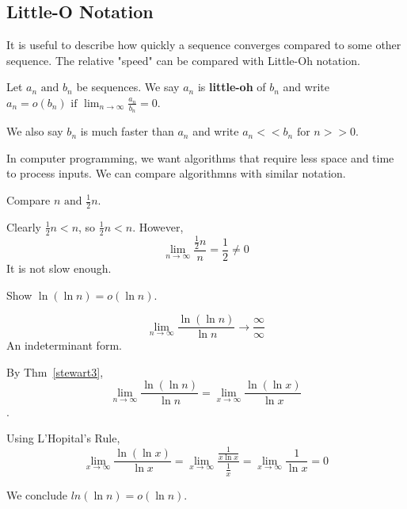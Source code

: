 \documentclass[../main.tex]{subfiles}
\begin{document}
\subsection{Little-O Notation}

It is useful to describe how quickly a sequence converges compared to some other sequence. The relative "speed" can be compared with Little-Oh notation.

\begin{definition}
    Let \( {a_n} \text{ and } {b_n} \) be sequences. We say \( a_n \) is \textbf{little-oh} of \( b_n \) and write \( a_n = o(b_n) \text{ if } \lim_{n \to \infty} \frac{a_n}{b_n} = 0 \).

    We also say \( b_n \) is much faster than \( a_n \) and write \( a_n << b_n \text{ for } n >> 0 \).
\end{definition}

In computer programming, we want algorithms that require less space and time to process inputs. We can compare algorithmns with similar notation.

\begin{example}[]
    Compare \( {n} \text{ and } {\frac{1}{2}n} \).

    Clearly \( \frac{1}{2}n < n \), so \( \frac{1}{2}n < n \). However,
    \[ \lim_{n \to \infty } \frac{\frac{1}{2}n}{n} = \frac{1}{2} \neq 0 \]
    It is not slow enough.
\end{example}

\begin{example}[]
    Show \( \ln(\ln n) = o(\ln n) \).

    \[ \lim_{n \to \infty}\frac{\ln(\ln n)}{\ln n} \to \frac{\infty}{\infty}\]
    An indeterminant form.

    By Thm~\ref{stewart3}, \[ \lim_{n \to \infty}\frac{\ln(\ln n)}{\ln n} = \lim_{x \to \infty} \frac{\ln(\ln x)}{\ln x} \].

    Using L'Hopital's Rule, \[ \lim_{x \to \infty} \frac{\ln(\ln x)}{\ln x} = \lim_{x \to \infty} \frac{\frac{1}{x\ln x}}{\frac{1}{x}}
        = \lim_{x \to \infty} \frac{1}{\ln x} = 0 \]
    
        We conclude \( ln(\ln n) = o(\ln n) \).
\end{example}
\end{document}
